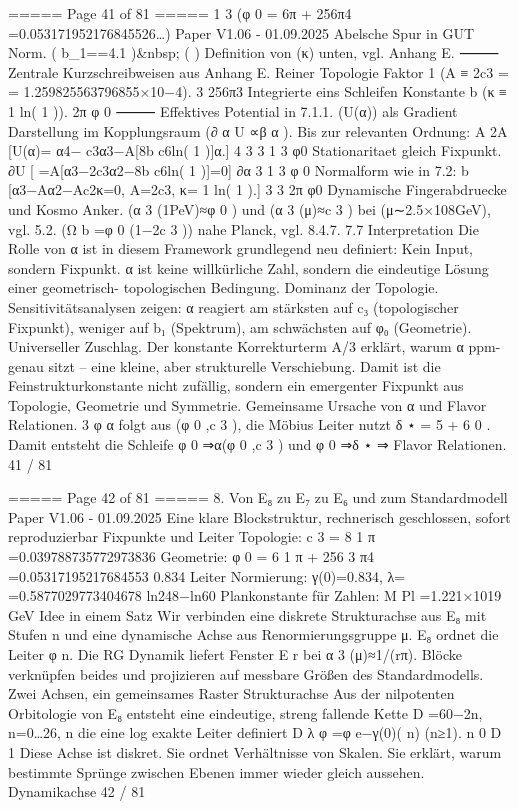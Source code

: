 \begin{MyVerbatim}
{===== Page 41 of 81 =====
1 3
(φ
0
=
6π
+
256π4
=0.053171952176845526…)
Paper V1.06 - 01.09.2025
Abelsche Spur in GUT Norm.
( b_{1}==4.1 )&nbsp; \; ( \Rightarrow ) Definition von (κ) unten, vgl. Anhang E.
⸻
Zentrale Kurzschreibweisen aus Anhang E.
Reiner Topologie Faktor
1
(A ≡ 2c3 = = 1.259825563796855×10−4).
3 256π3
Integrierte eins Schleifen Konstante
b
(κ ≡ 1 ln( 1 )).
2π φ 0
⸻
Effektives Potential in 7.1.1. (U(α)) als Gradient Darstellung im Kopplungsraum
(∂ α U ∝β α ). Bis zur relevanten Ordnung:
A 2A
[U(α)= α4− c3α3−A[8b c6ln( 1 )]α.]
4 3 3 1 3 φ0
Stationaritaet gleich Fixpunkt.
∂U
[ =A[α3−2c3α2−8b c6ln( 1 )]=0]
∂α 3 1 3 φ 0
Normalform wie in 7.2:
b
[α3−Aα2−Ac2κ=0, A=2c3, κ= 1 ln( 1 ).]
3 3 2π φ0
Dynamische Fingerabdruecke und Kosmo Anker.
(α 3 (1PeV)≈φ 0 ) und (α 3 (μ)≈c 3 ) bei (μ∼2.5×108GeV), vgl. 5.2.
(Ω b =φ 0 (1−2c 3 )) nahe Planck, vgl. 8.4.7.
7.7 Interpretation
Die Rolle von α ist in diesem Framework grundlegend neu definiert:
Kein Input, sondern Fixpunkt. α ist keine willkürliche Zahl, sondern die eindeutige Lösung einer geometrisch-
topologischen Bedingung.
Dominanz der Topologie. Sensitivitätsanalysen zeigen: α reagiert am stärksten auf c₃ (topologischer Fixpunkt),
weniger auf b₁ (Spektrum), am schwächsten auf φ₀ (Geometrie).
Universeller Zuschlag. Der konstante Korrekturterm A/3 erklärt, warum α ppm-genau sitzt – eine kleine, aber
strukturelle Verschiebung.
Damit ist die Feinstrukturkonstante nicht zufällig, sondern ein emergenter Fixpunkt aus Topologie, Geometrie und
Symmetrie.
Gemeinsame Ursache von α und Flavor Relationen.
3 φ
α folgt aus (φ 0 ,c 3 ), die Möbius Leiter nutzt δ ⋆ = 5 + 6 0 .
Damit entsteht die Schleife φ 0 ⇒α(φ 0 ,c 3 ) und φ 0 ⇒δ ⋆ ⇒ Flavor Relationen.
41 / 81

===== Page 42 of 81 =====
8. Von E₈ zu E₇ zu E₆ und zum Standardmodell
Paper V1.06 - 01.09.2025
Eine klare Blockstruktur, rechnerisch geschlossen, sofort reproduzierbar
Fixpunkte und Leiter
Topologie: c 3 = 8 1 π =0.039788735772973836
Geometrie: φ 0 = 6 1 π + 256 3 π4 =0.05317195217684553
0.834
Leiter Normierung: γ(0)=0.834, λ= =0.5877029773404678
ln248−ln60
Plankonstante für Zahlen: M Pl =1.221×1019 GeV
Idee in einem Satz
Wir verbinden eine diskrete Strukturachse aus E₈ mit Stufen n und eine dynamische Achse aus
Renormierungsgruppe μ.
E₈ ordnet die Leiter φ n. Die RG Dynamik liefert Fenster E r bei α 3 (μ)≈1/(rπ).
Blöcke verknüpfen beides und projizieren auf messbare Größen des Standardmodells.
Zwei Achsen, ein gemeinsames Raster
Strukturachse
Aus der nilpotenten Orbitologie von E₈ entsteht eine eindeutige, streng fallende Kette
D =60−2n, n=0…26,
n
die eine log exakte Leiter definiert
D λ
φ =φ e−γ(0)( n) (n≥1).
n 0 D
1
Diese Achse ist diskret. Sie ordnet Verhältnisse von Skalen. Sie erklärt, warum bestimmte Sprünge zwischen Ebenen
immer wieder gleich aussehen.
Dynamikachse
42 / 81

}
\end{MyVerbatim}

